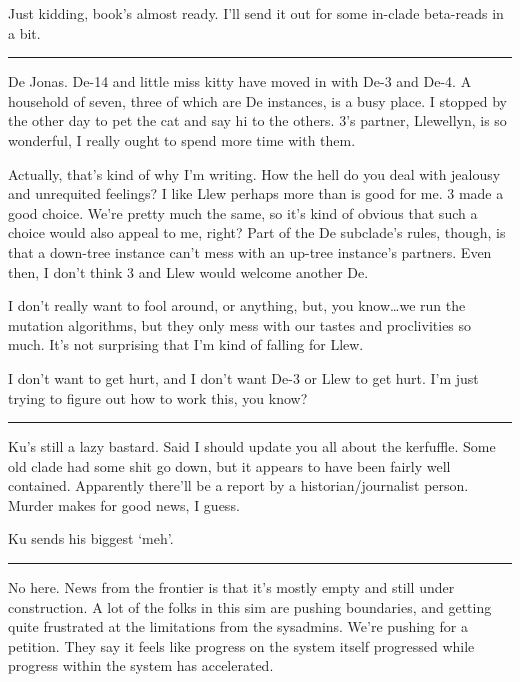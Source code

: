 Just kidding, book's almost ready. I'll send it out for some in-clade beta-reads in a bit.

\begin{center}\rule{0.5\linewidth}{\linethickness}\end{center}

De Jonas. De-14 and little miss kitty have moved in with De-3 and De-4. A household of seven, three of which are De instances, is a busy place. I stopped by the other day to pet the cat and say hi to the others. 3's partner, Llewellyn, is so wonderful, I really ought to spend more time with them.

Actually, that's kind of why I'm writing. How the hell do you deal with jealousy and unrequited feelings? I like Llew perhaps more than is good for me. 3 made a good choice. We're pretty much the same, so it's kind of obvious that such a choice would also appeal to me, right? Part of the De subclade's rules, though, is that a down-tree instance can't mess with an up-tree instance's partners. Even then, I don't think 3 and Llew would welcome another De.

I don't really want to fool around, or anything, but, you know\ldots{}we run the mutation algorithms, but they only mess with our tastes and proclivities so much. It's not surprising that I'm kind of falling for Llew.

I don't want to get hurt, and I don't want De-3 or Llew to get hurt. I'm just trying to figure out how to work this, you know?

\begin{center}\rule{0.5\linewidth}{\linethickness}\end{center}

Ku's still a lazy bastard. Said I should update you all about the kerfuffle. Some old clade had some shit go down, but it appears to have been fairly well contained. Apparently there'll be a report by a historian/journalist person. Murder makes for good news, I guess.

Ku sends his biggest `meh'.

\begin{center}\rule{0.5\linewidth}{\linethickness}\end{center}

No here. News from the frontier is that it's mostly empty and still under construction. A lot of the folks in this sim are pushing boundaries, and getting quite frustrated at the limitations from the sysadmins. We're pushing for a petition. They say it feels like progress on the system itself progressed while progress within the system has accelerated.

